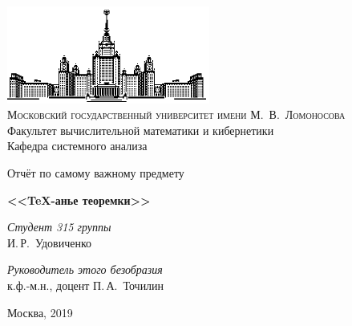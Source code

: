 \documentclass{subfiles}
\begin{document}
\thispagestyle{empty}

\begin{center}
\ \vspace{-3cm}

\includegraphics[width=0.5\textwidth]{msu.eps}\\
{\scshape Московский государственный университет имени М.~В.~Ломоносова}\\
Факультет вычислительной математики и кибернетики\\
Кафедра системного анализа

\vfill

{\LARGE Отчёт по самому важному предмету}

\vspace{1cm}

{\Huge\bfseries <<\TeX-анье теоремки>>}
\end{center}

\vspace{1cm}

\begin{flushright}
  \large
  \textit{Студент 315 группы}\\
  И.\,Р.~Удовиченко

  \vspace{5mm}

  \textit{Руководитель этого безобразия}\\
  к.ф.-м.н., доцент П.\,А.~Точилин
\end{flushright}

\vfill

\begin{center}
Москва, 2019
\end{center}

\newpage
\end{document}
